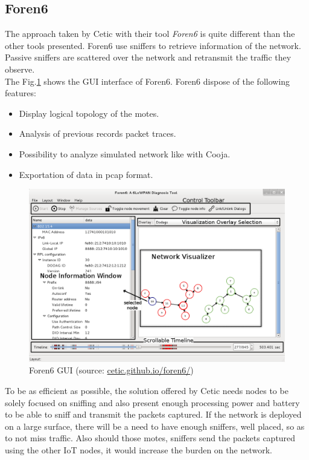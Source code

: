\subsection{Foren6}

The approach taken by Cetic with their tool \textit{Foren6} \cite{website:foren6} is quite different than the other tools presented. Foren6 use sniffers to retrieve information of the network. Passive sniffers are scattered over the network and retransmit the traffic they observe. \\

The Fig.\ref{fig:foren6} shows the GUI interface of Foren6. Foren6 dispose of the following features:
\begin{itemize}
  \item Display logical topology of the motes.
  \item Analysis of previous records packet traces.
  \item Possibility to analyze simulated network like with Cooja.
  \item Exportation of data in pcap format. \\
\end{itemize}

\begin{figure}
  \centering
  \includegraphics[width=\textwidth]{res/foren6.png}
  \caption{Foren6 GUI (source: \url{cetic.github.io/foren6/})}
  \label{fig:foren6}
\end{figure}

To be as efficient as possible, the solution offered by Cetic needs nodes to be solely focused on sniffing and also present enough processing power and battery to be able to sniff and transmit the packets captured. If the network is deployed on a large surface, there will be a need to have enough sniffers, well placed, so as to not miss traffic. Also should those motes, sniffers send the packets captured using the other IoT nodes, it would increase the burden on the network. \\

